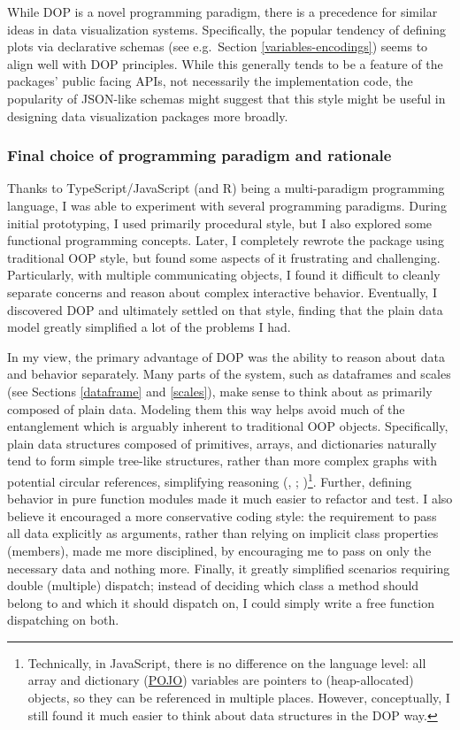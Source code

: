 \documentclass[
  openany]{book}
\theoremstyle{definition}
\theoremstyle{definition}
\theoremstyle{definition}
\theoremstyle{definition}
\theoremstyle{remark}
\begin{document}
While DOP is a novel programming paradigm, there is a precedence for similar ideas in data visualization systems. Specifically, the popular tendency of defining plots via declarative schemas (see e.g.~Section \ref{variables-encodings}) seems to align well with DOP principles. While this generally tends to be a feature of the packages' public facing APIs, not necessarily the implementation code, the popularity of JSON-like schemas might suggest that this style might be useful in designing data visualization packages more broadly.

\subsubsection{Final choice of programming paradigm and rationale}\label{final-choice-of-programming-paradigm-and-rationale}

Thanks to TypeScript/JavaScript (and R) being a multi-paradigm programming language, I was able to experiment with several programming paradigms. During initial prototyping, I used primarily procedural style, but I also explored some functional programming concepts. Later, I completely rewrote the package using traditional OOP style, but found some aspects of it frustrating and challenging. Particularly, with multiple communicating objects, I found it difficult to cleanly separate concerns and reason about complex interactive behavior. Eventually, I discovered DOP and ultimately settled on that style, finding that the plain data model greatly simplified a lot of the problems I had.

In my view, the primary advantage of DOP was the ability to reason about data and behavior separately. Many parts of the system, such as dataframes and scales (see Sections \ref{dataframe} and \ref{scales}), make sense to think about as primarily composed of plain data. Modeling them this way helps avoid much of the entanglement which is arguably inherent to traditional OOP objects. Specifically, plain data structures composed of primitives, arrays, and dictionaries naturally tend to form simple tree-like structures, rather than more complex graphs with potential circular references, simplifying reasoning (, ; )\footnote{Technically, in JavaScript, there is no difference on the language level: all array and dictionary (\hyperref[JSON]{POJO}) variables are pointers to (heap-allocated) objects, so they can be referenced in multiple places. However, conceptually, I still found it much easier to think about data structures in the DOP way.}. Further, defining behavior in pure function modules made it much easier to refactor and test. I also believe it encouraged a more conservative coding style: the requirement to pass all data explicitly as arguments, rather than relying on implicit class properties (members), made me more disciplined, by encouraging me to pass on only the necessary data and nothing more. Finally, it greatly simplified scenarios requiring double (multiple) dispatch; instead of deciding which class a method should belong to and which it should dispatch on, I could simply write a free function dispatching on both.
\end{document}

